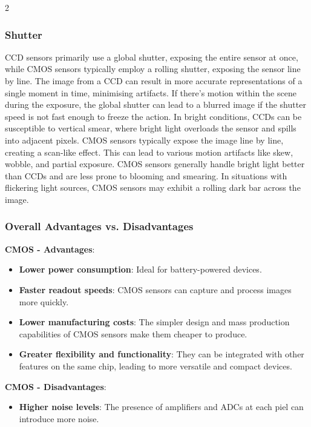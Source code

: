 \documentclass[10pt]{article}
\begin{document}
\begin{multicols}{2}
\subsubsection{Shutter}
CCD sensors primarily use a global shutter, exposing the entire sensor at once, while CMOS sensors typically employ a rolling shutter, exposing the sensor line by line.
\newline \newline
The image from a CCD can result in more accurate representations of a single moment in time, minimising artifacts. If there's motion within the scene during the exposure, the global shutter can lead to a blurred image if the shutter speed is not fast enough to freeze the action.
In bright conditions, CCDs can be susceptible to vertical smear, where bright light overloads the sensor and spills into adjacent pixels.
\newline \newline
CMOS sensors typically expose the image line by line, creating a scan-like effect. This can lead to various motion artifacts like skew, wobble, and partial exposure.
CMOS sensors generally handle bright light better than CCDs and are less prone to blooming and smearing. In situations with flickering light sources, CMOS sensors may exhibit a rolling dark bar across the image.

\subsubsection{Overall Advantages vs. Disadvantages}
\textbf{CMOS - Advantages}:
\begin{itemize}
    \item \textbf{Lower power consumption}: Ideal for battery-powered devices.
    \item \textbf{Faster readout speeds}: CMOS sensors can capture and process images more quickly.
    \item \textbf{Lower manufacturing costs}: The simpler design and mass production capabilities of CMOS sensors make them cheaper to produce.
    \item \textbf{Greater flexibility and functionality}: They can be integrated with other features on the same chip, leading to more versatile and compact devices.
\end{itemize}
\textbf{CMOS - Disadvantages}:
\begin{itemize}
    \item \textbf{Higher noise levels}: The presence of amplifiers and ADCs at each piel can introduce more noise.
\end{itemize}


\end{multicols}
\end{document}
